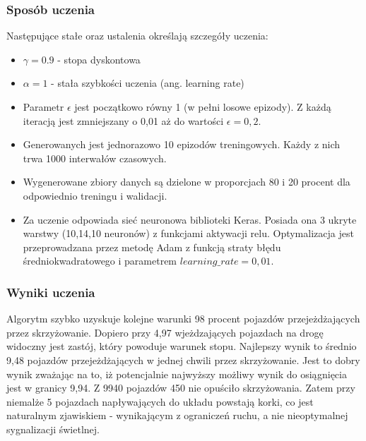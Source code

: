 \documentclass[12pt]{book}
\theoremstyle{plain}
\begin{document}
\subsubsection{Sposób uczenia}
Następujące stałe oraz ustalenia określają szczegóły uczenia:
\begin{itemize}
	\item $\gamma = 0.9$ - stopa dyskontowa
	\item $\alpha = 1$ - stała szybkości uczenia (ang. learning rate)
	\item Parametr $\epsilon$ jest początkowo równy 1 (w pełni losowe epizody). Z każdą iteracją jest zmniejszany o 0,01 aż do wartości $\epsilon=0,2$.
	\item Generowanych jest jednorazowo 10 epizodów treningowych. Każdy z nich trwa 1000 interwałów czasowych.
	\item Wygenerowane zbiory danych są dzielone w proporcjach 80 i 20 procent dla odpowiednio treningu i walidacji.
	\item Za uczenie odpowiada sieć neuronowa biblioteki Keras. Posiada ona 3 ukryte warstwy (10,14,10 neuronów) z funkcjami aktywacji relu. Optymalizacja jest przeprowadzana przez metodę Adam z funkcją straty błędu średniokwadratowego i parametrem $learning\_rate = 0,01$. 
\end{itemize}

\subsubsection*{Wyniki uczenia}
Algorytm szybko uzyskuje kolejne warunki 98 procent pojazdów przejeżdżających przez skrzyżowanie. Dopiero przy 4,97 wjeżdzających pojazdach na drogę widoczny jest zastój, który powoduje warunek stopu.
Najlepszy wynik to średnio 9,48 pojazdów przejeżdżających w jednej chwili przez skrzyżowanie. Jest to dobry wynik zważając na to, iż potencjalnie najwyższy możliwy wynik do osiągnięcia jest w granicy 9,94. Z 9940 pojazdów 450 nie opuściło skrzyżowania. Zatem przy niemalże 5 pojazdach napływających do układu powstają korki, co jest naturalnym zjawiskiem - wynikającym z ograniczeń ruchu, a nie nieoptymalnej sygnalizacji świetlnej.
\end{document}
